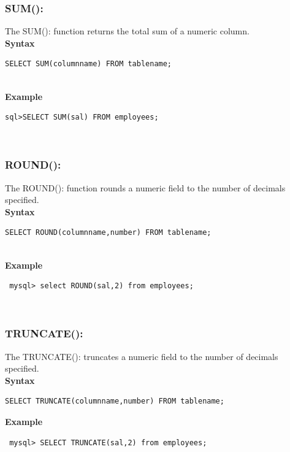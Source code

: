 \documentclass[11pt,a4paper]{article}
\begin{document}
\subsubsection*{SUM():} The SUM(): function returns the total sum of a numeric column.\\

\textbf{Syntax}\\
\begin{verbatim}SELECT SUM(columnname) FROM tablename; \end{verbatim}\\

\textbf{Example}
\begin{verbatim}sql>SELECT SUM(sal) FROM employees; \end{verbatim}\\

\subsubsection*{ROUND():} The ROUND(): function rounds a numeric field to the number of decimals specified.\\

\textbf{Syntax}\\
\begin{verbatim}SELECT ROUND(columnname,number) FROM tablename; \end{verbatim}\\

\textbf{Example}
\begin{verbatim} mysql> select ROUND(sal,2) from employees; \end{verbatim}\\

\subsubsection*{TRUNCATE():} The TRUNCATE(): truncates a numeric field to the number of decimals specified.\\

\textbf{Syntax}\\
\begin{verbatim}SELECT TRUNCATE(columnname,number) FROM tablename; \end{verbatim}

\textbf{Example}
\begin{verbatim} mysql> SELECT TRUNCATE(sal,2) from employees; \end{verbatim}
\end{document}
